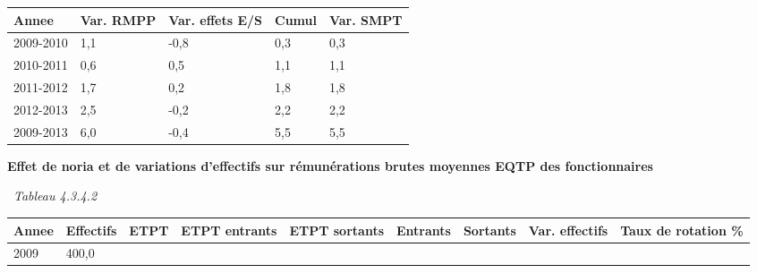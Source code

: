 \begin{longtable}[]{@{}lllll@{}}
\toprule
Annee & Var. RMPP & Var. effets E/S & Cumul & Var. SMPT\tabularnewline
\midrule
\endhead
2009-2010 & 1,1 & -0,8 & 0,3 & 0,3\tabularnewline
2010-2011 & 0,6 & 0,5 & 1,1 & 1,1\tabularnewline
2011-2012 & 1,7 & 0,2 & 1,8 & 1,8\tabularnewline
2012-2013 & 2,5 & -0,2 & 2,2 & 2,2\tabularnewline
2009-2013 & 6,0 & -0,4 & 5,5 & 5,5\tabularnewline
\bottomrule
\end{longtable}

\textbf{Effet de noria et de variations d'effectifs sur rémunérations
brutes moyennes EQTP des fonctionnaires}

~\emph{Tableau 4.3.4.2}

\begin{longtable}[]{@{}lllllllll@{}}
\toprule
\begin{minipage}[b]{0.05\columnwidth}\raggedright
Annee\strut
\end{minipage} & \begin{minipage}[b]{0.08\columnwidth}\raggedright
Effectifs\strut
\end{minipage} & \begin{minipage}[b]{0.05\columnwidth}\raggedright
ETPT\strut
\end{minipage} & \begin{minipage}[b]{0.10\columnwidth}\raggedright
ETPT entrants\strut
\end{minipage} & \begin{minipage}[b]{0.10\columnwidth}\raggedright
ETPT sortants\strut
\end{minipage} & \begin{minipage}[b]{0.07\columnwidth}\raggedright
Entrants\strut
\end{minipage} & \begin{minipage}[b]{0.07\columnwidth}\raggedright
Sortants\strut
\end{minipage} & \begin{minipage}[b]{0.11\columnwidth}\raggedright
Var. effectifs\strut
\end{minipage} & \begin{minipage}[b]{0.14\columnwidth}\raggedright
Taux de rotation \%\strut
\end{minipage}\tabularnewline
\midrule
\endhead
\begin{minipage}[t]{0.05\columnwidth}\raggedright
2009\strut
\end{minipage} & \begin{minipage}[t]{0.08\columnwidth}\raggedright
400,0\strut

\end{minipage}
\end{longtable}
